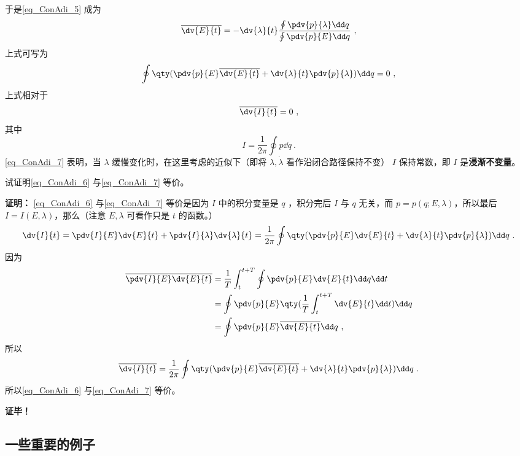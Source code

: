 于是\autoref{eq_ConAdi_5} 成为
\begin{equation}
\overline{\dv{E}{t}}=-\dv{\lambda}{t}
\frac{\oint\pdv{p}{\lambda}\dd q}
{\oint\pdv{p}{E}\dd q}~,
\end{equation}
上式可写为
\begin{equation}\label{eq_ConAdi_6}
\oint\qty(\pdv{p}{E}\overline{\dv{E}{t}}+\dv{\lambda}{t}\pdv{p}{\lambda})\dd q=0~,
\end{equation}
上式相对于
\begin{equation}\label{eq_ConAdi_7}
\overline{\dv{I}{t}}=0~,
\end{equation}
其中
\begin{equation}
I=\frac{1}{2\pi}\oint p\dd q~.
\end{equation}
 \autoref{eq_ConAdi_7} 表明，当 $\lambda$ 缓慢变化时，在这里考虑的近似下（即将 $\lambda,\dot\lambda$ 看作沿闭合路径保持不变） $I$ 保持常数，即 $I$ 是\textbf{浸渐不变量}。
\begin{exercise}{}
试证明\autoref{eq_ConAdi_6} 与\autoref{eq_ConAdi_7} 等价。

\textbf{证明：}
\autoref{eq_ConAdi_6} 与\autoref{eq_ConAdi_7} 等价是因为 $I$ 中的积分变量是 $q$ ，积分完后 $I$ 与 $q$ 无关，而 $p=p(q;E,\lambda)$，所以最后 $I=I(E,\lambda)$，那么（注意 $E,\lambda$ 可看作只是 $t$ 的函数。）
\begin{equation}
\dv{I}{t}=\pdv{I}{E}\dv{E}{t}+\pdv{I}{\lambda}\dv{\lambda}{t}=\frac{1}{2\pi}\oint\qty(\pdv{p}{E}\dv{E}{t}+\dv{\lambda}{t}\pdv{p}{\lambda})\dd q~.
\end{equation}
因为
  \begin{equation}
  \begin{aligned}
\overline{\pdv{I}{E}\dv{E}{t}}&=\frac{1}{T}\int_t^{t+T}\oint\pdv{p}{E}\dv{E}{t}\dd q\dd t\\
&=\oint\pdv{p}{E}\qty(\frac{1}{T}\int_t^{t+T}\dv{E}{t}\dd t)\dd q\\
&=\oint\pdv{p}{E}\overline{\dv{E}{t}}\dd q~,
\end{aligned}
\end{equation}
所以
\begin{equation}
\overline{\dv{I}{t}}=\frac{1}{2\pi}\oint\qty(\pdv{p}{E}\overline{\dv{E}{t}}+\dv{\lambda}{t}\pdv{p}{\lambda})\dd q~.
\end{equation}
所以\autoref{eq_ConAdi_6} 与\autoref{eq_ConAdi_7} 等价。

\textbf{证毕！}
\end{exercise}
 \subsection{一些重要的例子}
